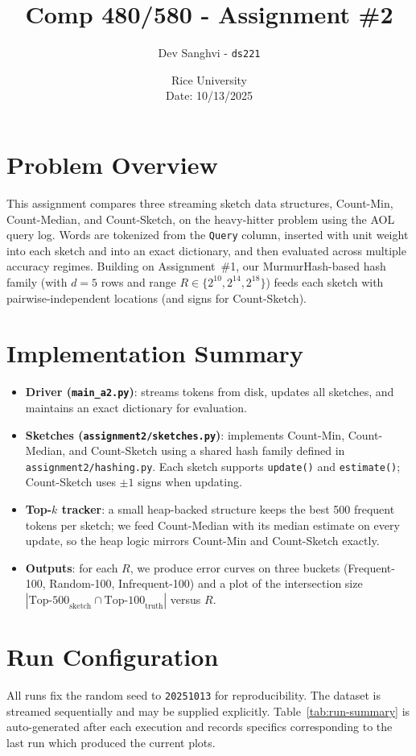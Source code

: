 \documentclass[11pt]{article}
\title{Comp 480/580 - Assignment \#2}
\author{Dev Sanghvi - \texttt{ds221}}
\date{Rice University \\ Date: 10/13/2025}
\begin{document}
\maketitle

\section*{Problem Overview}
This assignment compares three streaming sketch data structures, Count-Min, Count-Median, and Count-Sketch, on the heavy-hitter problem using the AOL query log. Words are tokenized from the \texttt{Query} column, inserted with unit weight into each sketch and into an exact dictionary, and then evaluated across multiple accuracy regimes. Building on Assignment~\#1, our MurmurHash-based hash family (with $d=5$ rows and range $R\in\{2^{10},2^{14},2^{18}\}$) feeds each sketch with pairwise-independent locations (and signs for Count-Sketch).

\section{Implementation Summary}
\begin{itemize}
  \item \textbf{Driver (\texttt{main\_a2.py})}: streams tokens from disk, updates all sketches, and maintains an exact dictionary for evaluation.
  \item \textbf{Sketches (\texttt{assignment2/sketches.py})}: implements Count-Min, Count-Median, and Count-Sketch using a shared hash family defined in \texttt{assignment2/hashing.py}. Each sketch supports \texttt{update()} and \texttt{estimate()}; Count-Sketch uses $\pm1$ signs when updating.
  \item \textbf{Top-$k$ tracker}: a small heap-backed structure keeps the best 500 frequent tokens per sketch; we feed Count-Median with its median estimate on every update, so the heap logic mirrors Count-Min and Count-Sketch exactly.
  \item \textbf{Outputs}: for each $R$, we produce error curves on three buckets (Frequent-100, Random-100, Infrequent-100) and a plot of the intersection size $|\text{Top-500}_\text{sketch}\cap\text{Top-100}_\text{truth}|$ versus $R$.
\end{itemize}

\section{Run Configuration}
All runs fix the random seed to \texttt{20251013} for reproducibility. The dataset is streamed sequentially and may be supplied explicitly.  Table~\ref{tab:run-summary} is auto-generated after each execution and records specifics corresponding to the last run which produced the current plots.
\end{document}

